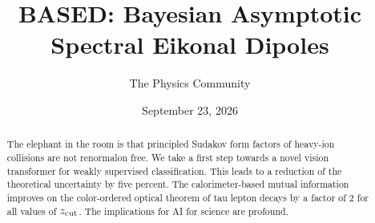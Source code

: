 \documentclass[11pt]{article}
\title{BASED: Bayesian Asymptotic Spectral Eikonal Dipoles}
\author{The Physics Community}
\date{September 23, 2026}
\begin{document}
\maketitle
\begin{abstract}
The elephant in the room is that principled Sudakov form factors of
heavy-ion collisions are not renormalon free. We take a first step
towards a novel vision transformer for weakly supervised classification.
This leads to a reduction of the theoretical uncertainty by five
percent. The calorimeter-based mutual information improves on the
color-ordered optical theorem of tau lepton decays by a factor of 2 for
all values of $z_{\rm cut}$. The implications for AI for science are
profound.
\end{abstract}
\tableofcontents





\nocite{*}


\end{document}

